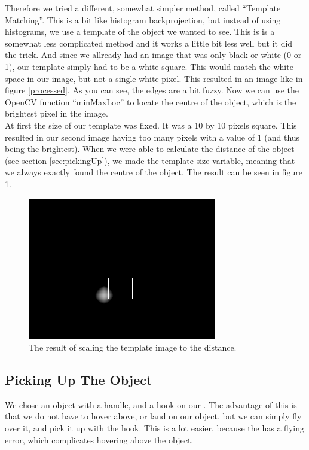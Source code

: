 Therefore we tried a different, somewhat simpler method, called ``Template Matching''. This is a bit like histogram backprojection, but instead of using histograms, we 
use a template of the object we wanted to see. This is is a somewhat less complicated method and it works a little bit less well but it did the trick. And 
since we allready had an image that was only black or white (0 or 1), our template simply had to be a white square. This would match the white space in our image, but not a
 single white pixel. This resulted in an image like in figure \ref{processed}. As you can see, the edges are a bit fuzzy. Now we can use the OpenCV function ``minMaxLoc'' 
to locate the centre of the object, which is the brightest pixel in the image.  \\

At first the size of our template was fixed. It was a 10 by 10 pixels square. This resulted in our second image having too many pixels with a value of 1 (and thus being 
the brightest). When we were able to calculate the distance of the object (see section \ref{sec:pickingUp}), we made the template size variable, meaning that we always 
exactly found the centre of the object. The result can be seen in figure \ref{fig:betterR}. 

\begin{figure}
  \centering
      \includegraphics[scale=0.51]{betterR.png}
  \caption{The result of scaling the template image to the distance.}
  \label{fig:betterR}
\end{figure}


\subsection{Picking Up The Object}
We chose an object with a handle, and a hook on our \Ardrone. The advantage of this is that we do not have to hover above, or land on our object, but we can simply fly over it, and pick it up with the hook. This is a lot easier, because the \Ardrone has a flying error, which complicates hovering above the object. 

